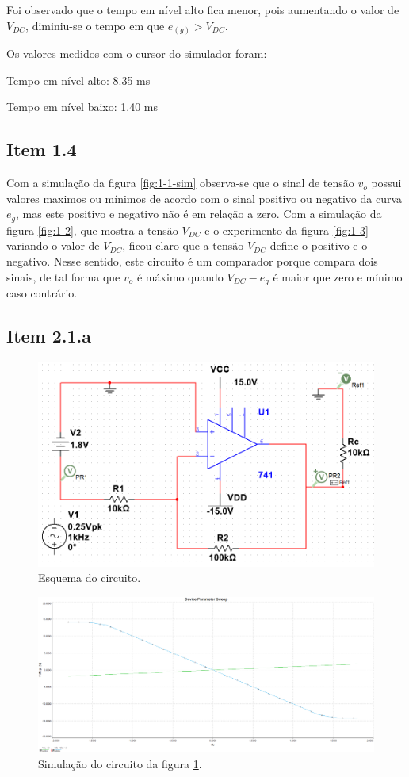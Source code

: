 \documentclass[11pt]{article}
\begin{document}
Foi observado que o tempo em nível alto fica menor, pois aumentando o valor de $V_{DC}$, diminiu-se o tempo em que $e_(g) > V_{DC}$.

Os valores medidos com o cursor do simulador foram:

Tempo em nível alto: 8.35 ms

Tempo em nível baixo: 1.40 ms

\subsection*{Item 1.4}

Com a simulação da figura \ref{fig:1-1-sim} observa-se que o sinal de tensão $v_{o}$ possui valores maximos ou mínimos de acordo com o sinal positivo ou negativo da curva $e_{g}$, mas este positivo e negativo não é em relação a zero. Com a simulação da figura \ref{fig:1-2}, que mostra a tensão $V_{DC}$ e o experimento da figura \ref{fig:1-3} variando o valor de $V_{DC}$, ficou claro que a tensão $V_{DC}$ define o positivo e o negativo. Nesse sentido, este circuito é um comparador porque compara dois sinais, de tal forma que $v_{o}$ é máximo quando $V_{DC} - e_{g}$ é maior que zero e mínimo caso contrário.

\subsection*{Item 2.1.a}

\begin{figure}[h!]
  \centering
  \includegraphics[width=.8\textwidth]{fig/circ2_a}
  \caption{Esquema do circuito.}
  \label{fig:circ2a}
\end{figure}

\begin{figure}[h!]
  \centering
  \includegraphics[width=\textwidth]{fig/sim2_a}
  \caption{Simulação do circuito da figura \ref{fig:circ2a}.}
  \label{fig:2-1a}
\end{figure}
\end{document}
